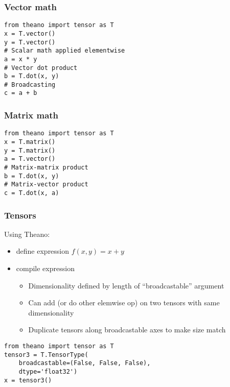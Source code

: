 \documentclass[utf8x,xcolor=pdftex,dvipsnames,table]{beamer}
\begin{document}
\begin{frame}[fragile]
  \frametitle{Vector math}

\begin{lstlisting}
from theano import tensor as T
x = T.vector()
y = T.vector()
# Scalar math applied elementwise
a = x * y
# Vector dot product
b = T.dot(x, y)
# Broadcasting
c = a + b
\end{lstlisting}
\end{frame}

\begin{frame}[fragile]
  \frametitle{Matrix math}

\begin{lstlisting}
from theano import tensor as T
x = T.matrix()
y = T.matrix()
a = T.vector()
# Matrix-matrix product
b = T.dot(x, y)
# Matrix-vector product
c = T.dot(x, a)
\end{lstlisting}
\end{frame}

\begin{frame}[fragile]
  \frametitle{Tensors}
  Using Theano:
  \begin{itemize}
  \item define expression $f(x,y) = x + y$
  \item compile expression
    \begin{itemize}
    \item Dimensionality defined by length of ``broadcastable'' argument
    \item Can add (or do other elemwise op) on two
      tensors with same dimensionality
    \item Duplicate tensors along broadcastable axes to
      make size match
    \end{itemize}
  \end{itemize}
\begin{lstlisting}
from theano import tensor as T
tensor3 = T.TensorType(
    broadcastable=(False, False, False),
    dtype='float32')
x = tensor3()
\end{lstlisting}
\end{frame}
\end{document}
